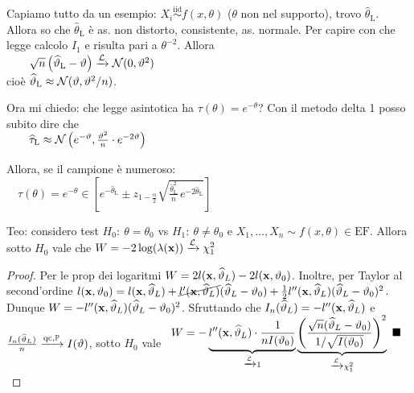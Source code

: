 Capiamo tutto da un esempio: $X_i\overset{\text{iid}}{\sim}f(x,\theta)$ ($\theta$ non nel supporto), trovo $\hat{\theta}_{\text{L}}$. Allora so che $\hat{\theta}_{\text{L}}$ è as. non distorto, consistente, as. normale. Per capire con che legge calcolo $I_1$ e risulta pari a $\theta^{-2}$. Allora \\
$\text{}\qquad \sqrt{n}\left(\widehat{\vartheta}_{\text{L}}-\vartheta\right)\xrightarrow{\mathcal{L}}\mathcal{N}(0,\vartheta^2)$ \\
cioè $\widehat{\vartheta}_{\text{L}}\approx\mathcal{N}(\vartheta,\vartheta^2/n)$.

\smallskip

Ora mi chiedo: che legge asintotica ha $\tau(\theta)=e^{-\theta}$? Con il metodo delta 1 posso subito dire che \\
$\text{}\qquad \widehat{\tau}_{\text{L}}\approx\mathcal{N}\left(e^{-\vartheta},\frac{\vartheta^2}{n}\cdot e^{-2\vartheta}\right)$

\smallskip

Allora, se il campione è numeroso: \\
$\text{}\quad \tau(\theta)=e^{-\theta}\in\left[e^{-\hat{\theta}_{\text{L}}}\pm z_{1-\frac{\alpha}{2}}\sqrt{\frac{\hat{\theta}_{\text{L}}^2}{n}\,e^{-2\hat{\theta}_{\text{L}}}} \right]$

\smallskip

Teo: considero test $H_0:\ \theta=\theta_0$ vs $H_1:\ \theta\neq\theta_0$ e $X_1,\ldots,X_n\sim f(x,\theta)\in\text{EF}$. Allora sotto $H_0$ vale che $W=-2\log(\lambda(\mathbf{x}))\xrightarrow{\mathcal{L}}\chi^2_1$

\begin{proof}
Per le prop dei logaritmi $W=2l(\mathbf{x},\widehat{\vartheta}_L)-2l(\mathbf{x},\vartheta_0)$. Inoltre, per Taylor al second'ordine $l(\mathbf{x},\vartheta_0)=l(\mathbf{x},\widehat{\vartheta}_L)+\cancel{ l'(\mathbf{x},\widehat{\vartheta}_L) }(\widehat{\vartheta}_L-\vartheta_0)+\frac{1}{2}l''(\mathbf{x},\widehat{\vartheta}_L)(\widehat{\vartheta}_L-\vartheta_0)^2$. Dunque $W=-l''(\mathbf{x},\widehat{\vartheta}_L)(\widehat{\vartheta}_L-\vartheta_0)^2$. Sfruttando che $I_n(\widehat{\vartheta}_L)=-l''(\mathbf{x},\widehat{\vartheta}_L)$ e $\frac{I_n(\widehat{\vartheta}_L)}{n}\xrightarrow{\text{qc},\mathbb{P}} I(\vartheta)$, sotto $H_0$ vale
$\begin{array}{l}
W=-\underbrace{l''(\xv,\hat{\theta}_L)\cdot\frac{1}{nI(\theta_0)}}_{\xrightarrow{\Lc}1} \underbrace{\left(\frac{\sqrt{n}(\hat{\theta}_L-\theta_0)}{1/\sqrt{I(\theta_0)}}\right)^2}_{\xrightarrow{\Lc}\chi^2_1}\ \blacksquare
\end{array}$
\end{proof}


